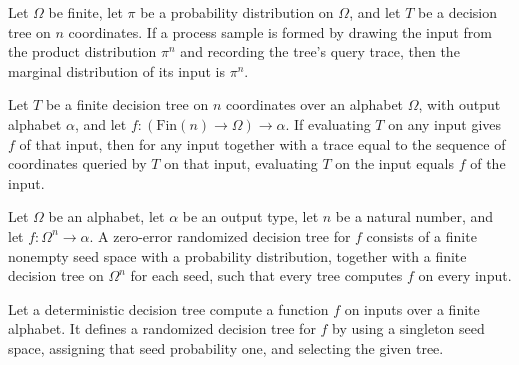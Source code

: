 \begin{theorem}
\label{FABL.FiniteDecisionTree.decisionTreeProcessPMF_map_input}
\leanok
{}
Let $\Omega$ be finite, let $\pi$ be a probability distribution on $\Omega$, and let $T$
be a decision tree on $n$ coordinates. If a process sample is formed by drawing the
input from the product distribution $\pi^n$ and recording the tree's query trace, then
the marginal distribution of its input is $\pi^n$.
\end{theorem}

\begin{theorem}
\label{FABL.FiniteDecisionTree.ProcessSample.eval_eq_of_computes}
\leanok
{}
Let $T$ be a finite decision tree on $n$ coordinates over an alphabet $\Omega$, with
output alphabet $\alpha$, and let $f:(\mathrm{Fin}(n)\to\Omega)\to\alpha$. If evaluating
$T$ on any input gives $f$ of that input, then for any input together with a trace equal
to the sequence of coordinates queried by $T$ on that input, evaluating $T$ on the input
equals $f$ of the input.
\end{theorem}

\begin{definition}
\label{FABL.RandomizedDecisionTree}
\leanok
{}
Let $\Omega$ be an alphabet, let $\alpha$ be an output type, let $n$ be a natural
number, and let $f : \Omega^n \to \alpha$. A zero-error randomized decision tree for $f$
consists of a finite nonempty seed space with a probability distribution, together with
a finite decision tree on $\Omega^n$ for each seed, such that every tree computes $f$ on
every input.
\end{definition}

\begin{definition}
\label{FABL.RandomizedDecisionTree.ofDeterministic}
\leanok
{}
Let a deterministic decision tree compute a function $f$ on inputs over a finite
alphabet. It defines a randomized decision tree for $f$ by using a singleton seed space,
assigning that seed probability one, and selecting the given tree.
\end{definition}


